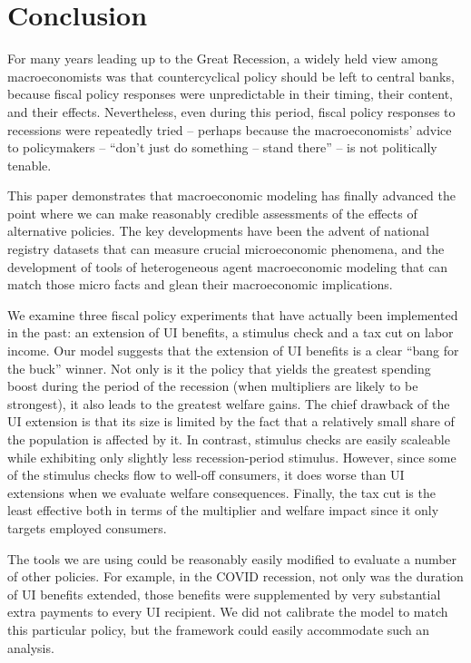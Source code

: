 \documentclass[../HAFiscal]{subfiles}
\begin{document}
\section{Conclusion}

For many years leading up to the Great Recession, a widely held view among macroeconomists was that countercyclical policy should be left to central banks, because fiscal policy responses were unpredictable in their timing, their content, and their effects.  Nevertheless, even during this period, fiscal policy responses to recessions were repeatedly tried -- perhaps because the macroeconomists' advice to policymakers -- ``don't just do something -- stand there'' -- is not politically tenable.

This paper demonstrates that macroeconomic modeling has finally advanced the point where we can make reasonably credible assessments of the effects of alternative policies.  The key developments have been the advent of national registry datasets that can measure crucial microeconomic phenomena, and the development of tools of heterogeneous agent macroeconomic modeling that can match those micro facts and glean their macroeconomic implications.

We examine three fiscal policy experiments that have actually been implemented in the past: an extension of UI benefits, a stimulus check and a tax cut on labor income.  Our model suggests that the extension of UI benefits is a clear ``bang for the buck'' winner.  Not only is it the policy that yields the greatest spending boost during the period of the recession (when multipliers are likely to be strongest), it also leads to the greatest welfare gains. The chief drawback of the UI extension is that its size is limited by the fact that a relatively small share of the population is affected by it. In contrast, stimulus checks are easily scaleable while exhibiting only slightly less recession-period stimulus. However, since some of the stimulus checks flow to well-off consumers, it does worse than UI extensions when we evaluate  welfare consequences. Finally, the tax cut is the least effective both in terms of the multiplier and welfare impact since it only targets employed consumers.

The tools we are using could be reasonably easily modified to evaluate a number of other policies.  For example, in the COVID recession, not only was the duration of UI benefits extended, those benefits were supplemented by very substantial extra payments to every UI recipient.  We did not calibrate the model to match this particular policy, but the framework could easily accommodate such an analysis.
\end{document}
